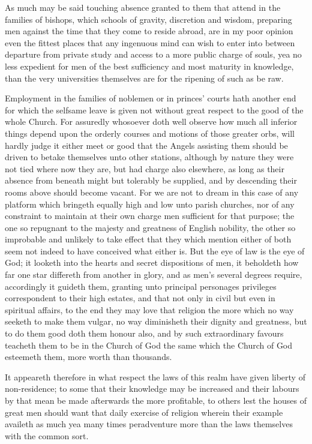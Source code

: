 As much may be said touching absence granted to them that attend in the families of bishops, which schools of gravity, discretion and wisdom, preparing men against the time that they come to reside abroad, are in my poor opinion even the fittest places that any ingenuous mind can wish to enter into between departure from private study and access to a more  public charge of souls, yea no less expedient for men of the best sufficiency and most maturity in knowledge, than the very universities themselves are for the ripening of such as be raw.

Employment in the families of noblemen or in princes’ courts hath another end for which the selfsame leave is given not without great respect to the good of the whole Church. For assuredly whosoever doth well observe how much all inferior things depend upon the orderly courses and motions of those greater orbs, will hardly judge it either meet or good that the Angels assisting them should be driven to betake themselves unto other stations, although by nature they were not tied where now they are, but had charge also elsewhere, as long as their absence from beneath might but tolerably be supplied, and by descending their rooms above should become vacant. For we are not to dream in this case of any platform which bringeth equally high and low unto parish churches, nor of any constraint to maintain at their own charge men sufficient for that purpose; the one so repugnant to the majesty and greatness of English nobility, the other so improbable and unlikely to take effect that they which mention either of both seem not indeed to have conceived what either is. But the eye of law is the eye of God; it looketh into the hearts and secret dispositions of men, it beholdeth how far one star differeth from another in glory, and as men’s several degrees require, accordingly it guideth them, granting unto principal personages privileges correspondent to their high estates, and that not only in civil but even in spiritual affairs, to the end they may love that religion the more which no way seeketh to make them vulgar, no way diminisheth their dignity and greatness, but to do them good doth them honour also, and by such extraordinary favours teacheth them to be in the Church of God the same which the Church of God esteemeth them, more worth than thousands.

It appeareth therefore in what respect the laws of this realm have given liberty of non-residence; to some that their knowledge may be increased and their labours by that mean be made afterwards the more profitable, to others lest the houses of great men should want that daily exercise of religion wherein their example availeth as much yea many times peradventure more than the laws themselves with the common sort.




